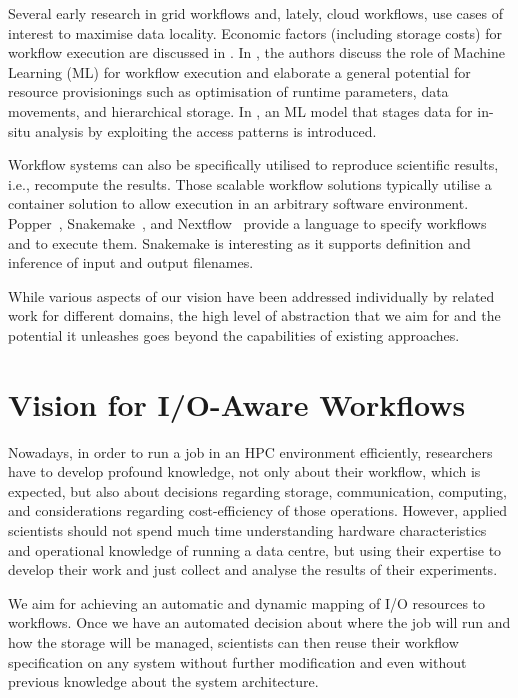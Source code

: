 \documentclass{superfri}
\begin{document}
Several early research in grid workflows and, lately, cloud workflows, use cases of interest to maximise data locality.
Economic factors (including storage costs) for workflow execution are discussed in \cite{alkhanak2016cost}.
In \cite{deelman2019role}, the authors discuss the role of Machine Learning (ML) for workflow execution and elaborate a general potential for resource provisionings such as optimisation of runtime parameters, data movements, and hierarchical storage.
In \cite{subedi2019leveraging}, an ML model that stages data for in-situ analysis by exploiting the access patterns is introduced.

Workflow systems can also be specifically utilised to reproduce scientific results, i.e., recompute the results.
Those scalable workflow solutions typically utilise a container solution to allow execution in an arbitrary software environment.
Popper~\cite{jimenez2017popper}, Snakemake~\cite{bts480}, and Nextflow~\cite{Nextflow} provide a language to specify workflows and to execute them.
Snakemake is interesting as it supports definition and inference of input and output filenames.

While various aspects of our vision have been addressed individually by related work for different domains, the high level of abstraction that we aim for and the potential it unleashes goes beyond the capabilities of existing approaches.

\section{Vision for I/O-Aware Workflows}
\label{sec:vision}

Nowadays, in order to run a job in an HPC environment efficiently, researchers have to develop profound knowledge, not only about their workflow, which is expected, but also about decisions regarding storage, communication, computing, and considerations regarding cost-efficiency of those operations.
However, applied scientists should not spend much time understanding hardware characteristics and operational knowledge of running a data centre, but using their expertise to develop their work and just collect and analyse the results of their experiments.

We aim for achieving an automatic and dynamic mapping of I/O resources to workflows.
Once we have an automated decision about where the job will run and how the storage will be managed, scientists can then reuse their workflow specification on any system without further modification and even without previous knowledge about the system architecture.
\end{document}

